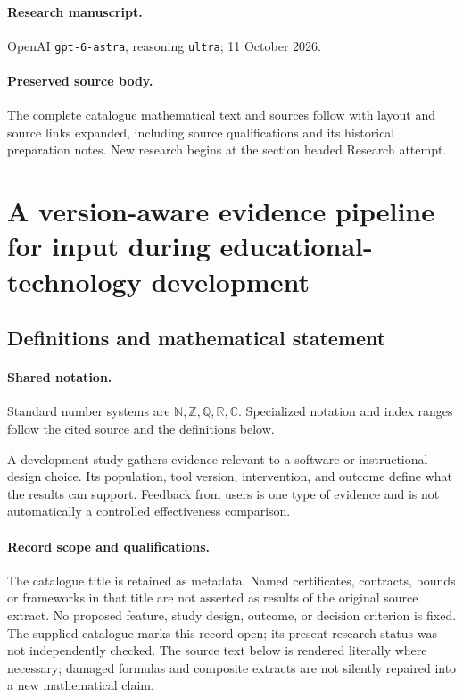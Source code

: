 \documentclass[11pt]{article}
\begin{document}
\paragraph{Research manuscript.} OpenAI \texttt{gpt-6-astra}, reasoning \texttt{ultra}; 11 October 2026.
\paragraph{Preserved source body.} The complete catalogue mathematical text and sources follow with layout and source links expanded, including source qualifications and its historical preparation notes. New research begins at the section headed Research attempt.

\section{A version-aware evidence pipeline for input during educational-technology development}\label{statement}

\subsection{Definitions and mathematical statement}

\paragraph{Shared notation.}Standard number systems are $\mathbb N,\mathbb Z,\mathbb Q,\mathbb R,\mathbb C$. Specialized notation and index ranges follow the cited source and the definitions below.


A development study gathers evidence relevant to a software or instructional design choice. Its population, tool version, intervention, and outcome define what the results can support. Feedback from users is one type of evidence and is not automatically a controlled effectiveness comparison.
\paragraph{Record scope and qualifications.}
The catalogue title is retained as metadata. Named certificates, contracts, bounds or frameworks in that title are not asserted as results of the original source extract.
No proposed feature, study design, outcome, or decision criterion is fixed. The supplied catalogue marks this record open; its present research status was not independently checked.
The source text below is rendered literally where necessary; damaged formulas and composite extracts are not silently repaired into a new mathematical claim.
\end{document}
